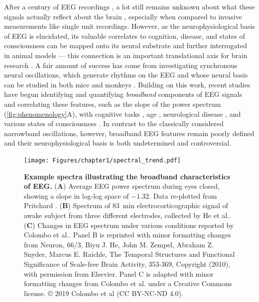 After a century of EEG recordings \cite{Berger1929}, a lot still remains unknown about what these signals actually reflect about the brain \cite{Cohen2017}, especially when compared to invasive measurements like single unit recordings. However, as the neurophysiological basis of EEG is elucidated, its valuable correlates to cognition, disease, and states of consciousness can be mapped onto its neural substrate and further interrogated in animal models --- this connection is an important translational axis for brain research \cite{da2013eeg}. A fair amount of success has come from investigating synchronous neural oscillations, which generate rhythms on the EEG and whose neural basis can be studied in both mice and monkeys \cite{Buzsaki2004}. Building on this work, recent studies have begun identifying and quantifying \textit{broadband} components of EEG signals and correlating these features, such as the slope of the power spectrum (\autoref{fig:phenomenology}A), with cognitive tasks \cite{Ouyang2020,Podvalny2015,He2010,Waschke2021}, age \cite{Voytek2015}, neurological disease \cite{Wang2022, Pertermann2019, Schaworonkow2021, OSTLUND2021100931, MOLINA2020562, Robertson2019, Roche2019}, and various states of consciousness \cite{Colombo2019, Stock2020, Lendner2020, MUTHUKUMARASWAMY2018582}. In contrast to the classically considered narrowband oscillations, however, broadband EEG features remain poorly defined and their neurophysiological basis is both undetermined and controversial. 

\begin{figure}[b!]
    \centering
    \texttt{[image: Figures/chapter1/spectral\_trend.pdf]}
    
    \caption{\textbf{Example spectra illustrating the broadband characteristics of EEG.} 
    (\textbf{A}) Average EEG power spectrum during eyes closed, showing a slope in log-log space of $-1.32$. Data re-plotted from Pritchard \cite{Pritchard1992}. (\textbf{B}) Spectrum of \qty{83}{\minute} electrocorticographic signal of awake subject from three different electrodes, collected by He et al.\cite{He2010}.  (\textbf{C}) Changes in EEG spectrum under various conditions reported by Colombo et al.\cite{Colombo2019}. Panel B is reprinted with minor formatting changes from Neuron, 66/3, Biyu J. He, John M. Zempel, Abraham Z. Snyder, Marcus E. Raichle, The Temporal Structures and Functional Significance of Scale-free Brain Activity, 353-369, Copyright (2010), with permission from Elsevier. Panel C is adapted with minor formatting changes from Colombo et al. \cite{Colombo2019} under a Creative Commons license. © 2019 Colombo et al (CC BY-NC-ND 4.0).
    } 
    \label{fig:phenomenology}
\end{figure}

